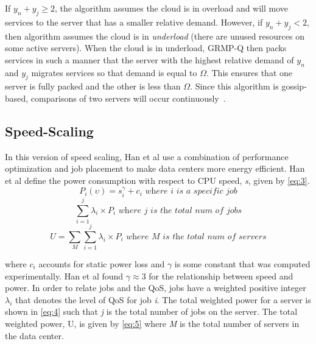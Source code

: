 \documentclass{sig-alternate}
\begin{document}
If $y_n + y_j \geq 2$, the algorithm assumes the cloud is in overload and will move services to the server that has a smaller relative demand. However, if $y_n + y_j < 2$, then algorithm assumes the cloud is in \emph{underload} (there are unused resources on some active servers). When the cloud is in underload, GRMP-Q then packs services in such a manner that the server with the highest relative demand of $y_n$ and $y_j$ migrates services so that demand is equal to $\Omega$. This ensures that one server is fully packed and the other is less than $\Omega$. Since this algorithm is gossip-based,  comparisons of two servers will occur continuously~\cite{Yanggratoke}.  



\subsection{Speed-Scaling}
\label{sec:Speed}
In this version of speed scaling, Han et al use a combination of performance optimization and job placement to make data centers more energy efficient. Han et al define the power consumption with respect to CPU speed, \emph{s}, given by \eqref{eq:3}. 
\begin{equation}
P_{i}(\upsilon) = s_{i}^{\gamma}+ c_i \textit{~where i is a specific job}\label{eq:3}
\end{equation}
\begin{equation}
\sum_{i=1}^j \lambda_{i} \times P_{i}\textit{~where j is the total num of jobs}\label{eq:4}
\end{equation}
\begin{equation}
U =\sum_{M}\sum_{i=1}^j \lambda_{i} \times P_{i}\textit{~where M is the total num of servers}\label{eq:5}
\end{equation}

where $c_i$ accounts for static power loss and $\gamma$ is some constant that was computed experimentally. Han et al found $\gamma \approx 3$ for the relationship between speed and power. In order to relate jobs and the QoS, jobs have a weighted positive integer $\lambda_i$ that denotes the level of QoS for job \emph{i}. The total weighted power for a server is shown in \eqref{eq:4} such that \emph{j} is the total number of jobs on the server. The total weighted power, U, is given by \eqref{eq:5} where \emph{M} is the total number of servers in the data center.
\end{document}
